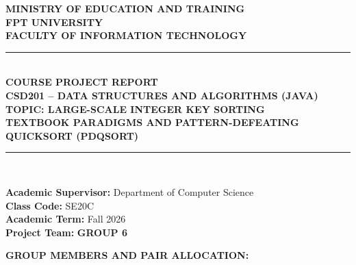 \documentclass[conference]{IEEEtran}
\begin{document}
\onecolumn
\thispagestyle{empty}
\begin{center}

\vspace*{0.5cm}
{\Large\bfseries MINISTRY OF EDUCATION AND TRAINING}\\[0.2cm]
{\LARGE\bfseries FPT UNIVERSITY}\\[0.2cm]
{\large\bfseries FACULTY OF INFORMATION TECHNOLOGY}\\[1.5cm]

\rule{0.9\textwidth}{2pt}\\[0.6cm]

{\huge\bfseries COURSE PROJECT REPORT}\\[0.4cm]
{\Large\bfseries CSD201 -- DATA STRUCTURES AND ALGORITHMS (JAVA)}\\[0.6cm]

{\LARGE\bfseries TOPIC: LARGE-SCALE INTEGER KEY SORTING}\\[0.3cm]
{\Large\bfseries TEXTBOOK PARADIGMS AND PATTERN-DEFEATING QUICKSORT (PDQSORT)}\\[0.6cm]

\rule{0.9\textwidth}{2pt}\\[1.5cm]

\begin{flushleft}
\large
\hspace{2.5cm}\textbf{Academic Supervisor:} Department of Computer Science\\
\hspace{2.5cm}\textbf{Class Code:} SE20C\\
\hspace{2.5cm}\textbf{Academic Term:} Fall 2026\\
\hspace{2.5cm}\textbf{Project Team:} \textbf{GROUP 6}\\
\end{flushleft}

\vspace{0.8cm}
{\large\bfseries GROUP MEMBERS AND PAIR ALLOCATION:}\\[0.5cm]


\end{center}
\end{document}
